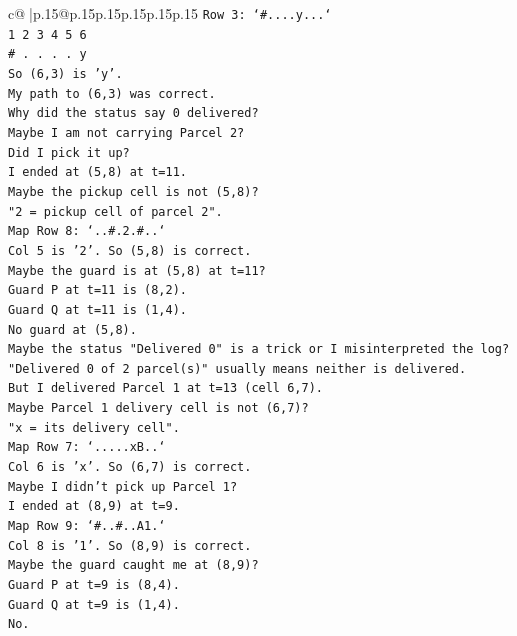 \documentclass{article}
\begin{document}
{\begin{supertabular}{c@{$\;$}|p{.15\linewidth}@{}p{.15\linewidth}p{.15\linewidth}p{.15\linewidth}p{.15\linewidth}p{.15\linewidth}}
{{{\texttt{Row 3: `\#....y...`} \\
\texttt{1 2 3 4 5 6} \\
\texttt{\# . . . . y} \\
\texttt{So (6,3) is 'y'.} \\
\texttt{My path to (6,3) was correct.} \\
\texttt{Why did the status say 0 delivered?} \\
\texttt{Maybe I am not carrying Parcel 2?} \\
\texttt{Did I pick it up?} \\
\texttt{I ended at (5,8) at t=11.} \\
\texttt{Maybe the pickup cell is not (5,8)?} \\
\texttt{"2 = pickup cell of parcel 2".} \\
\texttt{Map Row 8: `..\#.2.\#..`} \\
\texttt{Col 5 is '2'. So (5,8) is correct.} \\
\texttt{Maybe the guard is at (5,8) at t=11?} \\
\texttt{Guard P at t=11 is (8,2).} \\
\texttt{Guard Q at t=11 is (1,4).} \\
\texttt{No guard at (5,8).} \\
\texttt{Maybe the status "Delivered 0" is a trick or I misinterpreted the log?} \\
\texttt{"Delivered 0 of 2 parcel(s)" usually means neither is delivered.} \\
\texttt{But I delivered Parcel 1 at t=13 (cell 6,7).} \\
\texttt{Maybe Parcel 1 delivery cell is not (6,7)?} \\
\texttt{"x = its delivery cell".} \\
\texttt{Map Row 7: `.....xB..`} \\
\texttt{Col 6 is 'x'. So (6,7) is correct.} \\
\texttt{Maybe I didn't pick up Parcel 1?} \\
\texttt{I ended at (8,9) at t=9.} \\
\texttt{Map Row 9: `\#..\#..A1.`} \\
\texttt{Col 8 is '1'. So (8,9) is correct.} \\
\texttt{Maybe the guard caught me at (8,9)?} \\
\texttt{Guard P at t=9 is (8,4).} \\
\texttt{Guard Q at t=9 is (1,4).} \\
\texttt{No.} \\
}}}
\end{supertabular}}
\end{document}
